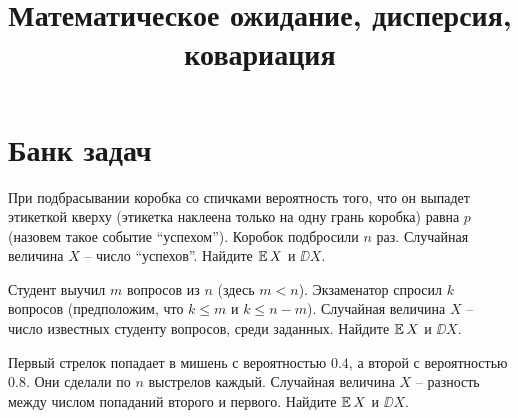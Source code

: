 

\title{Математическое ожидание, дисперсия, ковариация}
\date{\vspace{-1cm}}


\maketitle

\section*{Банк задач}
\begin{problem}
    При подбрасывании коробка со спичками вероятность того, что он выпадет этикеткой кверху (этикетка наклеена только на одну грань коробка) равна $p$ (назовем такое событие ``успехом'').
    Коробок подбросили $n$ раз.
    Случайная величина $X$ -- число ``успехов''.
    Найдите $\operatorname{\mathbb{E}} X$ и $\DD X$.
\end{problem}

\begin{problem}
    Студент выучил $m$ вопросов из $n$ (здесь $m < n$).
    Экзаменатор спросил $k$ вопросов (предположим, что $k \leq m$ и $k \leq n - m$).
    Случайная величина $X$ -- число известных студенту вопросов, среди заданных.
    Найдите $\operatorname{\mathbb{E}} X$ и $\DD X$.
\end{problem}



\begin{problem}
    Первый стрелок попадает в мишень с вероятностью $0.4$, а второй с вероятностью $0.8$.
    Они сделали по $n$ выстрелов каждый.
    Случайная величина $X$ -- разность между числом попаданий второго и первого.
    Найдите $\operatorname{\mathbb{E}} X$ и $\DD X$.
\end{problem}

